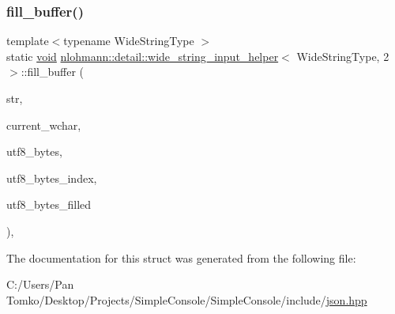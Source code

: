 \subsubsection{\texorpdfstring{fill\_buffer()}{fill\_buffer()}}
{\footnotesize\ttfamily template$<$typename Wide\+String\+Type $>$ \\
static \mbox{\hyperlink{namespacenlohmann_1_1detail_a59fca69799f6b9e366710cb9043aa77d}{void}} \mbox{\hyperlink{structnlohmann_1_1detail_1_1wide__string__input__helper}{nlohmann\+::detail\+::wide\+\_\+string\+\_\+input\+\_\+helper}}$<$ Wide\+String\+Type, 2 $>$\+::fill\+\_\+buffer (\begin{DoxyParamCaption}\item[{const Wide\+String\+Type \&}]{str,  }\item[{size\+\_\+t \&}]{current\+\_\+wchar,  }\item[{\mbox{\hyperlink{namespacenlohmann_1_1detail_a1ed8fc6239da25abcaf681d30ace4985af1f713c9e000f5d3f280adbd124df4f5}{std\+::array}}$<$ std\+::char\+\_\+traits$<$ char $>$\+::int\+\_\+type, 4 $>$ \&}]{utf8\+\_\+bytes,  }\item[{size\+\_\+t \&}]{utf8\+\_\+bytes\+\_\+index,  }\item[{size\+\_\+t \&}]{utf8\+\_\+bytes\+\_\+filled }\end{DoxyParamCaption})\hspace{0.3cm}{\ttfamily [inline]}, {\ttfamily [static]}}



The documentation for this struct was generated from the following file\+:\begin{DoxyCompactItemize}
\item 
C\+:/\+Users/\+Pan Tomko/\+Desktop/\+Projects/\+Simple\+Console/\+Simple\+Console/include/\mbox{\hyperlink{json_8hpp}{json.\+hpp}}\end{DoxyCompactItemize}
